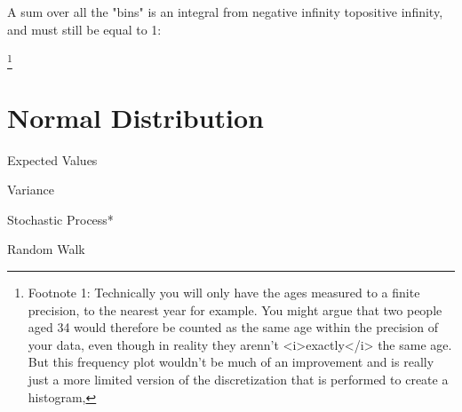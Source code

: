 \documentclass{article}
\begin{document}
A sum over all the "bins" is an integral from negative infinity topositive infinity, and must still be equal to 1: %


\footnote{Footnote 1: Technically you will only have the ages measured to a finite precision, to the nearest year for example.  You might argue that two people aged 34 would therefore be counted as the same age within the precision of your data, even though in reality they arenn't <i>exactly</i> the same age.  But this frequency plot wouldn't be much of an improvement and is really just a more limited version of the discretization that is performed to create a histogram,}


\section{Normal Distribution}


Expected Values


Variance


Stochastic Process*

Random Walk
\end{document}
